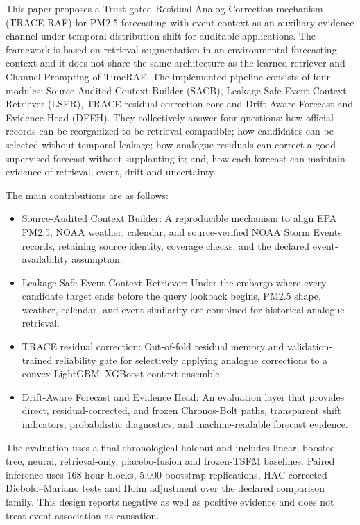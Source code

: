 \documentclass{ieeeaccess}
\begin{document}
This paper proposes a Trust-gated Residual Analog Correction mechanism (TRACE-RAF) for PM2.5 forecasting with event context as an auxiliary evidence channel under temporal distribution shift for auditable applications. The framework is based on retrieval augmentation in an environmental forecasting context and it does not share the same architecture as the learned retriever and Channel Prompting of TimeRAF. The implemented pipeline consists of four modules: Source-Audited Context Builder (SACB), Leakage-Safe Event-Context Retriever (LSER), TRACE residual-correction core and Drift-Aware Forecast and Evidence Head (DFEH). They collectively answer four questions: how official records can be reorganized to be retrieval compatible; how candidates can be selected without temporal leakage; how analogue residuals can correct a good supervised forecast without supplanting it; and, how each forecast can maintain evidence of retrieval, event, drift and uncertainty.

The main contributions are as follows:
\begin{itemize}
    \item Source-Audited Context Builder: A reproducible mechanism to align EPA PM2.5, NOAA weather, calendar, and source-verified NOAA Storm Events records, retaining source identity, coverage checks, and the declared event-availability assumption.
    \item Leakage-Safe Event-Context Retriever: Under the embargo where every candidate target ends before the query lookback begins, PM2.5 shape, weather, calendar, and event similarity are combined for historical analogue retrieval.
    \item TRACE residual correction: Out-of-fold residual memory and validation-trained reliability gate for selectively applying analogue corrections to a convex LightGBM--XGBoost context ensemble.
    \item Drift-Aware Forecast and Evidence Head: An evaluation layer that provides direct, residual-corrected, and frozen Chronos-Bolt paths, transparent shift indicators, probabilistic diagnostics, and machine-readable forecast evidence.
\end{itemize}

The evaluation uses a final chronological holdout and includes linear, boosted-tree, neural, retrieval-only, placebo-fusion and frozen-TSFM baselines. Paired inference uses 168-hour blocks, 5,000 bootstrap replications, HAC-corrected Diebold--Mariano tests and Holm adjustment over the declared comparison family. This design reports negative as well as positive evidence and does not treat event association as causation.
\end{document}
